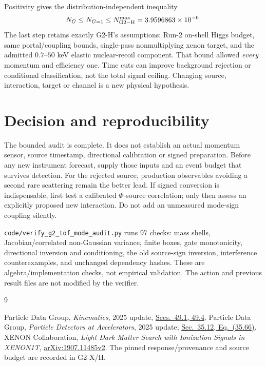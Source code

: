 \documentclass[11pt,a4paper]{article}
\begin{document}
Positivity gives the distribution-independent inequality
\begin{equation}
 N_G\leq N_{G=1}\leq N_{\rm G2-H}^{\max}
                =3.9596863\times10^{-6}.
\end{equation}
The last step retains exactly G2-H's assumptions: Run-2 on-shell Higgs
budget, same portal/coupling bounds, single-pass nonmultiplying xenon
target, and the admitted $0.7$--$50$ keV elastic nuclear-recoil component.
That bound allowed \emph{every} momentum and efficiency one.
Time cuts can improve background rejection or conditional
classification, not the total signal ceiling. Changing source,
interaction, target or channel is a new physical hypothesis.

\section{Decision and reproducibility}
The bounded audit is complete. It does not establish an actual momentum
sensor, source timestamp, directional calibration or signed preparation.
Before any new instrument forecast, supply those inputs and an event
budget that survives detection. For the rejected source, production
observables avoiding a second rare scattering remain the better lead.
If signed conversion is indispensable, first test a calibrated
$\Phi$-source correlation; only then assess an explicitly proposed
new interaction. Do not add an unmeasured mode-sign coupling silently.

\texttt{code/verify\_g2\_tof\_mode\_audit.py} runs 97 checks: mass shells,
Jacobian/correlated non-Gaussian variance, finite boxes, gate monotonicity,
directional inversion and conditioning, the old source-sign inversion,
interference counterexamples, and unchanged dependency hashes.
These are algebra/implementation checks, not empirical validation.
The action and previous result files are not modified by the verifier.

\begin{thebibliography}{9}\small\raggedright
{} Particle Data Group, \emph{Kinematics}, 2025 update,
\href{https://pdg.lbl.gov/2025/reviews/rpp2025-rev-kinematics.pdf}
{Secs.\ 49.1, 49.4}.
 Particle Data Group, \emph{Particle Detectors at
Accelerators}, 2025 update,
\href{https://pdg.lbl.gov/2025/reviews/rpp2025-rev-particle-detectors-accel.pdf}
{Sec.\ 35.12, Eq.\ (35.66)}.
 XENON Collaboration, \emph{Light Dark Matter Search with
Ionization Signals in XENON1T},
\href{https://arxiv.org/abs/1907.11485v2}{arXiv:1907.11485v2}.
The pinned response/provenance and source budget are recorded in G2-X/H.
\end{thebibliography}
\end{document}
